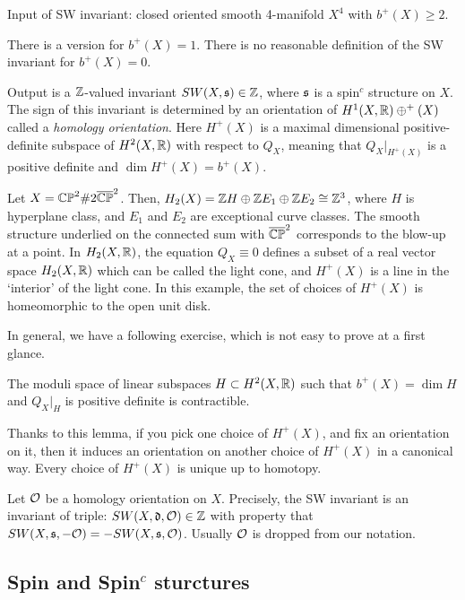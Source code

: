 \documentclass{../../../small}
\begin{document}
Input of SW invariant: closed oriented smooth 4-manifold $X^4$ with $b^+(X)\ge2$.


\begin{remark}
There is a version for $b^+(X)=1$.
There is no reasonable definition of the SW invariant for $b^+(X)=0$.
\end{remark}

Output is a $\mathbb{Z}$-valued invariant $SW(X,\mathfrak{s})\in\mathbb{Z}$, where $\mathfrak{s}$ is a spin$^c$ structure on $X$.
The sign of this invariant is determined by an orientation of $H^1(X,\mathbb{R})\oplus^+(X)$ called a \emph{homology orientation}.
Here $H^+(X)$ is a maximal dimensional positive-definite subspace of $H^2(X,\mathbb{R})$ with respect to $Q_X$, meaning that $Q_X|_{H^+(X)}$ is a positive definite and $\dim H^+(X)=b^+(X)$.


\begin{example}
Let $X=\mathbb{CP}^2\#2\overline{\mathbb{CP}}^2$.
Then, $H_2(X)=\mathbb{Z} H\oplus\mathbb{Z} E_1\oplus\mathbb{Z} E_2\cong\mathbb{Z}^3$, where $H$ is hyperplane class, and $E_1$ and $E_2$ are exceptional curve classes.
The smooth structure underlied on the connected sum with $\overline{\mathbb{CP}}^2$ corresponds to the blow-up at a point.
In $H_2(X,\mathbb{R})$, the equation $Q_X\equiv0$ defines a subset of a real vector space $H_2(X,\mathbb{R})$ which can be called the light cone, and $H^+(X)$ is a line in the `interior' of the light cone.
In this example, the set of choices of $H^+(X)$ is homeomorphic to the open unit disk.
\end{example}

In general, we have a following exercise, which is not easy to prove at a first glance.

\begin{lemma}
The moduli space of linear subspaces $H\subset H^2(X,\mathbb{R})$ such that $b^+(X)=\dim H$ and $Q_X|_H$ is positive definite is contractible.
\end{lemma}

Thanks to this lemma, if you pick one choice of $H^+(X)$, and fix an orientation on it, then it induces an orientation on another choice of $H^+(X)$ in a canonical way.
Every choice of $H^+(X)$ is unique up to homotopy.

Let $\mathcal{O}$ be a homology orientation on $X$.
Precisely, the SW invariant is an invariant of triple: $SW(X,\mathfrak{d},\mathcal{O})\in\mathbb{Z}$ with property that $SW(X,\mathfrak{s},-\mathcal{O})=-SW(X,\mathfrak{s},\mathcal{O})$.
Usually $\mathcal{O}$ is dropped from our notation.

\subsection{Spin and Spin$^c$ sturctures}
\end{document}
